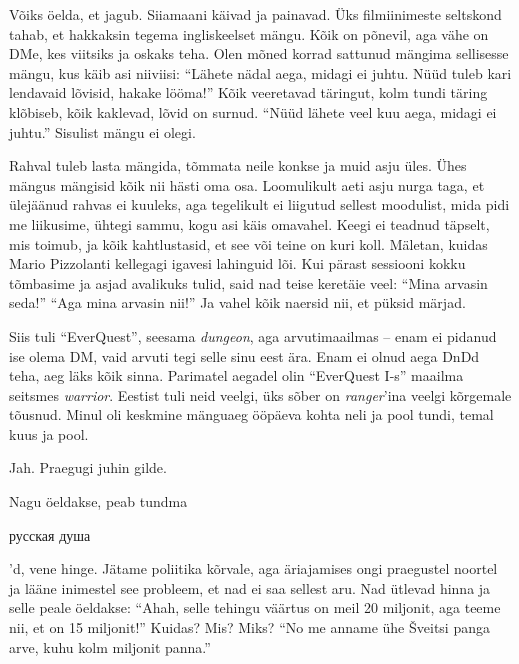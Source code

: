 
Võiks öelda, et jagub. Siiamaani käivad ja painavad. Üks filmiinimeste seltskond tahab, et hakkaksin tegema ingliskeelset mängu. Kõik 
on põnevil, aga vähe on DMe, kes viitsiks ja oskaks teha. Olen 
mõned korrad sattunud mängima sellisesse mängu, kus käib asi niiviisi: 
\enquote{Lähete nädal aega, midagi ei juhtu. Nüüd tuleb kari lendavaid lõvisid, 
hakake lööma!} Kõik veeretavad täringut, kolm tundi täring klõbiseb, kõik 
kaklevad, lõvid on surnud. \enquote{Nüüd lähete veel kuu aega, midagi ei juhtu.} 
Sisulist mängu ei olegi. 

Rahval tuleb lasta mängida, tõmmata neile konkse ja muid asju 
üles. Ühes mängus mängisid kõik nii hästi oma osa. Loomulikult 
aeti asju nurga taga, et ülejäänud rahvas ei kuuleks, aga tegelikult ei liigutud sellest 
moodulist, mida pidi me liikusime, ühtegi sammu, kogu asi käis 
omavahel. Keegi ei teadnud täpselt, mis toimub, ja kõik kahtlustasid, et see või teine on kuri 
koll. Mäletan, kuidas Mario Pizzolanti kellegagi igavesi lahinguid lõi. Kui pärast 
sessiooni kokku tõmbasime ja asjad avalikuks tulid, said nad teise keretäie veel: 
\enquote{Mina arvasin seda!} \enquote{Aga mina arvasin nii!} Ja vahel kõik 
naersid nii, et püksid märjad. 

Siis tuli \enquote{EverQuest}, seesama \emph{dungeon}, aga 
arvutimaailmas -- enam ei pidanud ise olema DM, vaid arvuti tegi selle sinu eest ära. 
Enam ei olnud aega DnDd teha, aeg läks kõik sinna. Parimatel 
aegadel olin \enquote{EverQuest I-s} maailma seitsmes \emph{warrior}. Eestist tuli 
neid veelgi, üks sõber on \emph{ranger}'ina veelgi kõrgemale tõusnud. Minul oli 
keskmine mänguaeg ööpäeva kohta neli ja pool tundi, temal kuus ja pool. 


Jah. Praegugi juhin gilde. 


Nagu öeldakse, peab tundma \begin{russian}русская душа\end{russian}'d, vene 
hinge. Jätame poliitika 
kõrvale, aga äriajamises ongi praegustel noortel ja lääne inimestel see probleem, et 
nad ei saa sellest aru. Nad ütlevad hinna ja selle peale öeldakse: \enquote{Ahah, 
selle tehingu väärtus on meil 20 miljonit, aga teeme nii, et on 15 
miljonit!} Kuidas? Mis? Miks? \enquote{No me anname ühe Šveitsi 
panga arve, kuhu kolm miljonit panna.}

